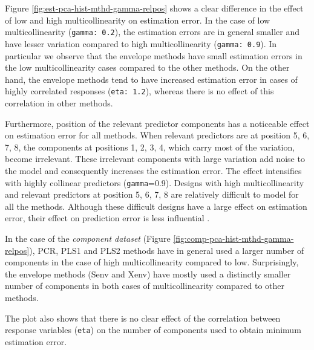 \documentclass[12pt,3p,authoryear]{elsarticle}
\begin{document}
Figure \ref{fig:est-pca-hist-mthd-gamma-relpos} shows a clear difference
in the effect of low and high multicollinearity on estimation error. In
the case of low multicollinearity (\texttt{gamma:\ 0.2}), the estimation
errors are in general smaller and have lesser variation compared to high
multicollinearity (\texttt{gamma:\ 0.9}). In particular we observe that
the envelope methods have small estimation errors in the low
multicollinearity cases compared to the other methods. On the other
hand, the envelope methods tend to have increased estimation error in
cases of highly correlated responses (\texttt{eta:\ 1.2}), whereas there
is no effect of this correlation in other methods.

Furthermore, position of the relevant predictor components has a
noticeable effect on estimation error for all methods. When relevant
predictors are at position 5, 6, 7, 8, the components at positions 1, 2,
3, 4, which carry most of the variation, become irrelevant. These
irrelevant components with large variation add noise to the model and
consequently increases the estimation error. The effect intensifies with
highly collinear predictors (\texttt{gamma}=0.9). Designs with high
multicollinearity and relevant predictors at position 5, 6, 7, 8 are
relatively difficult to model for all the methods. Although these
difficult designs have a large effect on estimation error, their effect
on prediction error is less influential \citep{rimal2019pred}.






In the case of the \emph{component dataset} (Figure
\ref{fig:comp-pca-hist-mthd-gamma-relpos}), PCR, PLS1 and PLS2 methods
have in general used a larger number of components in the case of high
multicollinearity compared to low. Surprisingly, the envelope methods
(Senv and Xenv) have mostly used a distinctly smaller number of
components in both cases of multicollinearity compared to other methods.

The plot also shows that there is no clear effect of the correlation
between response variables (\texttt{eta}) on the number of components
used to obtain minimum estimation error.
\end{document}
